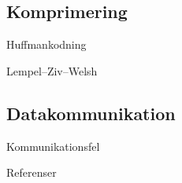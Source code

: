 \documentclass{beamer}
\theoremstyle{definition}
\theoremstyle{remark}
\begin{document}
\subsection{Komprimering}

\begin{frame}{\insertsubsectionhead}{Huffmankodning}
\end{frame}

\begin{frame}{\insertsubsectionhead}{Lempel--Ziv--Welsh}
\end{frame}

\subsection{Datakommunikation}

\begin{frame}{\insertsubsectionhead}{Kommunikationsfel}
\end{frame}



\begin{frame}{Referenser}
  
\end{frame}
\end{document}
